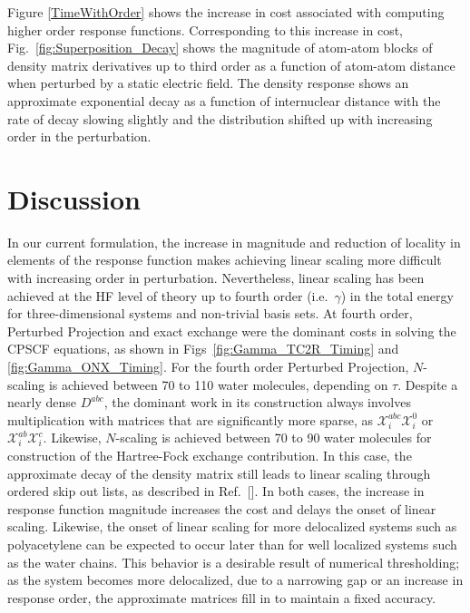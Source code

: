 \documentclass[prl,twocolumn,showpacs,twocolumngrid,superbib]{revtex4}
\def\X{\mathcal{X}}
\begin{document}
Figure \ref{TimeWithOrder} shows the increase in cost associated with computing  higher order response functions.
Corresponding to this increase in cost, Fig.~\ref{fig:Superposition_Decay} shows the magnitude of atom-atom blocks 
of density matrix derivatives up to third order as a function of atom-atom distance 
when perturbed by a static electric field.  The density response shows an approximate 
exponential decay as a function of internuclear distance with the rate of  decay
slowing slightly and the distribution shifted up with increasing order in the perturbation.

\section{Discussion}

In our current formulation, the increase in magnitude and reduction of locality in elements of the 
response function makes achieving linear scaling more difficult with increasing order in perturbation. 
Nevertheless, linear scaling has been achieved at the HF level of theory up to fourth order (i.e.~$\gamma$) 
in the total energy for three-dimensional systems and  non-trivial basis sets.  At fourth order,
Perturbed Projection and exact exchange were the dominant costs in solving the CPSCF equations,
as shown in Figs~\ref{fig:Gamma_TC2R_Timing} and \ref{fig:Gamma_ONX_Timing}.  For the fourth order Perturbed Projection, 
$N$-scaling is achieved 
between 70 to 110 water molecules, depending on $\tau$.  Despite a nearly dense $D^{abc}$, the 
dominant work in its construction always involves multiplication with matrices that are significantly 
more sparse, as $\X^{abc}_i\X^{0}_i$ or $\X^{ab}_i\X^{c}_i$.   Likewise, $N$-scaling is achieved between 
70 to 90 water molecules for construction of the Hartree-Fock exchange contribution.  In this case, 
the approximate decay of the density matrix still leads to linear scaling through ordered skip out lists,
as described in Ref.~[].  In both cases, the increase in response function magnitude
increases the cost and delays the onset of linear scaling.   Likewise, the onset of linear scaling for more  
delocalized systems such as polyacetylene can be expected to occur later than for well localized systems such 
as the water chains.  This behavior is a desirable result of numerical thresholding;  as the system becomes more 
delocalized, due to a narrowing gap or an increase in response order, the approximate matrices fill in to 
maintain a fixed accuracy\cite{ANiklasson03}.  
\end{document}

